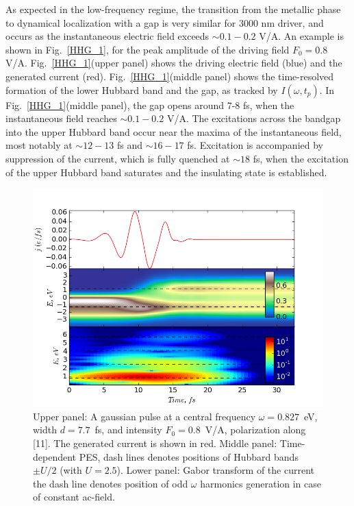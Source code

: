 As expected in the low-frequency regime, the
transition from the 
metallic phase to dynamical localization with
a gap is very similar for 3000 nm driver, and 
occurs as the instantaneous 
electric field exceeds $\sim 0.1-0.2$ V/A. An example
is shown in Fig.~\ref{HHG_1}, for the peak amplitude
of the driving field $F_{0}=0.8$ V/A.
Fig.~\ref{HHG_1}(upper panel) shows the driving electric field
(blue) and the generated current (red). Fig.~\ref{HHG_1}(middle panel) shows 
the time-resolved formation of the 
lower Hubbard band and the gap, as tracked by 
$I(\omega, t_p)$. In Fig.~\ref{HHG_1}(middle panel), the gap opens around 7-8 fs, 
when the instantaneous field reaches $\sim 0.1-0.2$ V/A. 
The excitations across the bandgap into the upper Hubbard 
band occur near the maxima of the instantaneous 
field, most notably at $\sim 12-13$ fs and $\sim 16-17$ fs.
Excitation is accompanied by 
suppression of the current, which is fully quenched 
at $\sim 18$ fs, when the excitation of the upper Hubbard band 
saturates and the insulating state is established. 
\begin{figure}[h!]
 \includegraphics[width=0.9\linewidth,angle=0]{Chapters/KH_solid/2_w_1_92.png}
\caption{Upper panel: A gaussian pulse at a central frequency $\omega=0.827$~eV, width $d=7.7$~fs, and intensity $F_{0}=0.8$~V/A, polarization along [11]. The generated current is shown in red. Middle panel: Time-dependent PES, dash lines denotes positions of Hubbard bands $\pm U/2$ (with $U=2.5$). Lower panel: Gabor transform of the current the dash line denotes position of odd $\omega$ harmonics generation in case of constant ac-field.}
\label{HHG_2}  
\end{figure}

